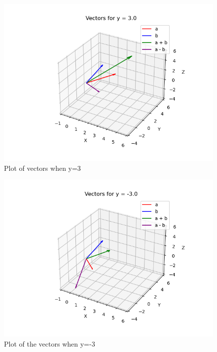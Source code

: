 \documentclass[journal]{IEEEtran}
\begin{document}
         \begin{figure}
             \centering
             \includegraphics[width=1\columnwidth]{figs/fig1.png}
             \caption{Plot of vectors when y=3 }
             \label{fig:fig1}
         \end{figure}
         \begin{figure}
             \centering
             \includegraphics[width=1\linewidth]{figs/fig2.png}
             \caption{Plot of the vectors when y=-3}
             \label{fig:placeholder}
         \end{figure}
         
\end{document}

